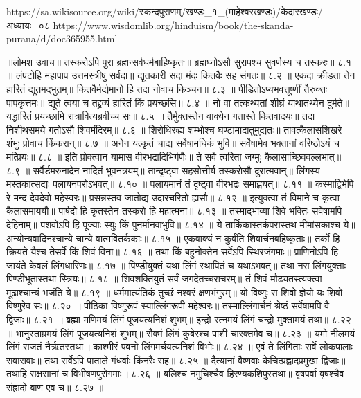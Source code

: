 https://sa.wikisource.org/wiki/स्कन्दपुराणम्/खण्डः_१_(माहेश्वरखण्डः)/केदारखण्डः/अध्यायः_०८
https://www.wisdomlib.org/hinduism/book/the-skanda-purana/d/doc365955.html

॥लोमश उवाच॥
तस्करोऽपि पुरा ब्रह्मन्सर्वधर्मबाहिष्कृतः॥
ब्रह्मघ्नोऽसौ सुरापश्च सुवर्णस्य च तस्करः॥ ८.१ ॥
लंपटोहि महापाप उत्तमस्त्रीषु सर्वदा॥
द्यूतकारी सदा मंदः कितवैः सह संगतः॥ ८.२ ॥
एकदा क्रीडता तेन हारितं द्यूतमद्भुतम्॥
कितवैर्मर्द्यमानो हि तदा नोवाच किञ्चन॥ ८.३ ॥
पीडितोऽप्यभवत्तूष्णीं तैरुक्तः पापकृत्तमः॥
द्यूते त्वया च तद्द्रव्यं हारितं किं प्रयच्छसि॥ ८.४ ॥
नो वा तत्कथ्यतां शीघ्रं याथातथ्येन दुर्मते॥
यद्धारितं प्रयच्छामि रात्रावित्यब्रवीच्च सः॥ ८.५ ॥
तैर्मुक्तस्तेन वाक्येन गतास्ते कितवादयः॥
तदा निशीथसमये गतोऽसौ शिवमंदिरम्॥ ८.६ ॥
शिरोधिरुह्य शम्भोश्च घण्टामादातुमुद्यतः॥
तावत्कैलासशिखरे शंभुः प्रोवाच किंकरान्॥ ८.७ ॥
अनेन यत्कृतं चाद्य सर्वेषामधिकं भुवि॥
सर्वेषामेव भक्तानां वरिष्ठोऽयं च मत्प्रियः॥ ८.८ ॥
इति प्रोक्त्वान यामास वीरभद्रादिभिर्गणैः॥
ते सर्वे त्वरिता जग्मुः कैलासाच्छिववल्लभात्॥ ८.९ ॥
सर्वैर्डमरुनादेन नादितं भुवनत्रयम्॥
तान्दृष्ट्वा सहसोत्तीर्य तस्करोसौ दुरात्मवान्॥
लिंगस्य मस्तकात्सद्यः पलायनपरोऽभवत्॥ ८.१० ॥
पलायमानं तं दृष्ट्वा वीरभद्रः समाह्वयत्॥ ८.११ ॥
कस्माद्विभेपि रे मन्द देवदेवो महेस्वरः॥
प्रसन्नस्तव जातोद्य उदारचरितो ह्यसौ॥ ८.१२ ॥
इत्युक्त्वा तं विमाने च कृत्वा कैलासमाययौ॥
पार्षदो हि कृतस्तेन तस्करो हि महात्मना॥ ८.१३ ॥
तस्माद्भाव्या शिवे भक्तिः सर्वेषामपि देहिनाम्॥
पशवोऽपि हि पूज्याः स्युः किं पुनर्मानवाभुवि॥ ८.१४ ॥
ये तार्किकास्तर्कपरास्तथ मीमांसकाश्च ये॥
अन्योन्यवादिनश्चान्ये चान्ये वात्मवितर्ककाः॥ ८.१५ ॥
एकवाक्यं न कुर्वंति शिवार्चनबहिष्कृताः॥
तर्को हि क्रियते यैश्च तेसर्वे किं शिवं विना॥ ८.१६ ॥
तथा किं बहुनोक्तेन सर्वेऽपि स्थिरजंगमाः॥
प्राणिनोऽपि हि जायंते केवलं लिंगधारिणः॥ ८.१७ ॥
पिण्डीयुक्तं यथा लिंगं स्थापितं च यथाऽभवत्॥
तथा नरा लिंगयुक्ताः पिण्डीभूतास्तथा स्त्रियः॥ ८.१८ ॥
शिवशक्तियुतं सर्वं जगदेतच्चराचरम्॥
तं शिवं मौढ्यतस्त्यक्त्वा मूढाश्चान्यं भजंति ये॥ ८.१९ ॥
धर्ममात्यंतिकं तुच्छं नश्वरं क्षणभंगुरम्॥
यो विष्णुः स शिवो ज्ञेयो यः शिवो विष्णुरेव सः॥ ८.२० ॥
पीठिका विष्णुरूपं स्याल्लिंगरूपी महेश्वरः॥
तस्माल्लिंगार्चनं श्रेष्ठं सर्वेषामपि वै द्विजाः॥ ८.२१ ॥
ब्रह्मा मणिमयं लिंगं पूजयत्यनिशं शुभम्॥
इन्द्रो रत्नमयं लिंगं चन्द्रो मुक्तामयं तथा॥ ८.२२ ॥
भानुस्ताम्रमयं लिंगं पूजयत्यनिशं शुभम्॥
रौक्मं लिंगं कुबेरश्च पाशी चारक्तमेव च॥ ८.२३ ॥
यमो नीलमयं लिंगं राजतं नैर्ऋतस्तथा॥
काश्मीरं पवनो लिंगमर्चयत्यनिशं विभोः॥ ८.२४ ॥
एवं ते लिंगिताः सर्वे लोकपालाः सवासवाः॥
तथा सर्वेऽपि पाताले गंधर्वाः किंनरैः सह॥ ८.२५ ॥
दैत्यानां वैष्णवाः केचित्प्रह्लादप्रमुखा द्विजाः॥
तथाहि राक्षसानां च विभीषणपुरोगमाः॥ ८.२६ ॥
बलिश्च नमुचिश्चैव हिरण्यकशिपुस्तथा॥
वृषपर्वा वृषश्चैव संह्रादो बाण एव च॥ ८.२७ ॥
